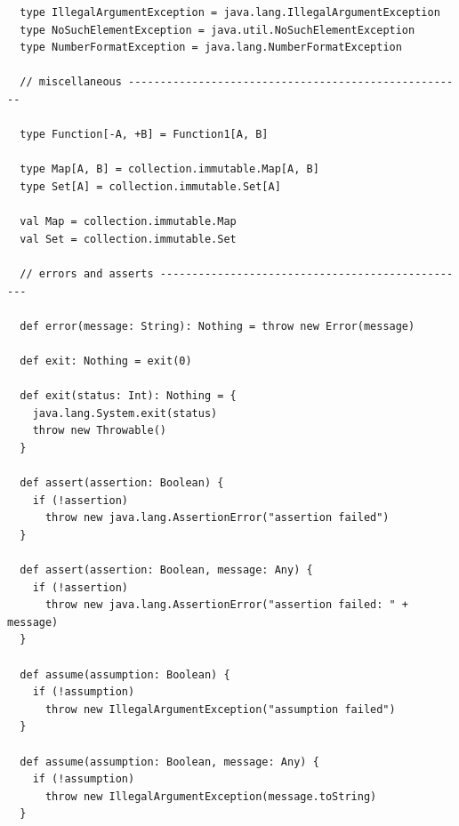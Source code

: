 \begin{lstlisting}
  type IllegalArgumentException = java.lang.IllegalArgumentException
  type NoSuchElementException = java.util.NoSuchElementException
  type NumberFormatException = java.lang.NumberFormatException

  // miscellaneous -----------------------------------------------------
  
  type Function[-A, +B] = Function1[A, B]

  type Map[A, B] = collection.immutable.Map[A, B]
  type Set[A] = collection.immutable.Set[A]

  val Map = collection.immutable.Map
  val Set = collection.immutable.Set

  // errors and asserts -------------------------------------------------

  def error(message: String): Nothing = throw new Error(message)

  def exit: Nothing = exit(0)

  def exit(status: Int): Nothing = {
    java.lang.System.exit(status)
    throw new Throwable()
  }

  def assert(assertion: Boolean) {
    if (!assertion)
      throw new java.lang.AssertionError("assertion failed")
  }

  def assert(assertion: Boolean, message: Any) {
    if (!assertion)
      throw new java.lang.AssertionError("assertion failed: " + message)
  }

  def assume(assumption: Boolean) {
    if (!assumption)
      throw new IllegalArgumentException("assumption failed")
  }

  def assume(assumption: Boolean, message: Any) {
    if (!assumption)
      throw new IllegalArgumentException(message.toString)
  }
\end{lstlisting}
\newpage

